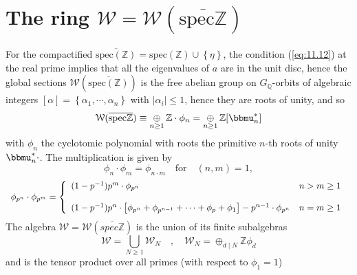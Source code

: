 \documentclass[leqno]{article}
\newcommand{\Q}{\mathbb{Q}}
\newcommand{\Z}{\mathbb{Z}}
\newcommand{\oplussum}{\mathop{\oplus}}
\numberwithin{equation}{section}
\begin{document}
\section{The ring $\mathcal{W}=\mathcal{W}(\overline{\text{spec} \Z})$}
For the compactified $\overline{\text{spec}(\Z)}=\text{spec}(\Z)\cup \left\{ \eta
				\right\}$, the condition (\ref{eq:11.12}) at the real prime implies that all the
				eigenvalues of $a$ are in the unit disc, hence the global sections
				$\mathcal{W}(\overline{\text{spec}(\Z)})$ is the free abelian group on
				$G_{\Q}$-orbits of algebraic integers $[\alpha]=\left\{ \alpha_1,\cdots ,
				\alpha_n \right\}$ with $|\alpha_{i}|\le 1$, hence they are roots of unity, and so
	\begin{equation}
		\mathcal{W}(\overline{\text{spec}\Z})\equiv \oplussum\limits_{n\ge 1}\Z\cdot
		\phi_{n} = \oplussum\limits_{n\ge 1}\Z[\bbmu_{n}^{\ast}]
		\label{eq:12.14}
	\end{equation}
				with $\phi_{n}$ the cyclotomic polynomial with roots the primitive $n$-th roots of unity
        $\bbmu_{n}^{*}\cdot$. The multiplication is given by
        \begin{equation}
          \label{eq:12.15} 
                    \phi_n\cdot \phi_m = \phi_{n\cdot m} \quad \text{for}\quad (n,m)=1, 
        \end{equation}
        \begin{equation}
          \begin{array}[H]{ll}
            \phi_{p^{n}}\cdot \phi_{p^{m}} = 
            \left\{\begin{array}[H]{lc}
                (1-p^{-1})p^{m}\cdot \phi_{p^n} & n>m\ge 1 \\\\
                (1-p^{-1})p^{n}\cdot \left[ \phi_{p^{n}}+\phi_{p^{n-1}}+\cdots
                +\phi_{p}+\phi_{1} \right] - p^{n-1}\cdot \phi_{p^{n}} & n=m\ge 1
          \end{array}\right.
          \end{array} 
          \label{eq:12.16}
        \end{equation}
        The algebra $\mathcal{W}=\mathcal{W}(\overline{spec \Z})$ is the union of its finite subalgebras
        \begin{equation}
          \label{eq:12.17}
          \mathcal{W}=\bigcup_{N\geq 1}\mathcal{W}_N \quad , \quad \mathcal{W}_N=\oplussum_{d\mid N}\Z \phi_d
        \end{equation}
        and is the tensor product over all primes (with respect to $\phi_1=1$)
\end{document}
